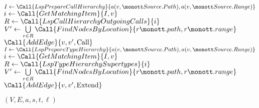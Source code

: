 \begin{algorithm}
\begin{algorithmic}[1]
		\Statex
		\State $I \gets \Call{LspPrepareCallHierarchy}{a(v, \tt{Source.Path}), a(v, \tt{Source.Range})}$
		\State $i \gets \Call{GetMatchingItem}{I, v}$
		\State $R \gets \Call{LspCallHierarchyOutgoingCalls}{i}$
		\State $V' \gets \bigcup\limits_{r \in R} \Call{FindNodesByLocation}{r\tt{.path}, r\tt{.range}}$
		\State $\Call{AddEdge}{v, v', \text{Call}}$
		\EndFor
		\State $I \gets \Call{LspPrepareTypeHierarchy}{a(v, \tt{Source.Path}), a(v, \tt{Source.Range})}$
		\State $i \gets \Call{GetMatchingItem}{I, v}$
		\State $R \gets \Call{LspTypeHierarchySupertypes}{i}$
		\State $V' \gets \bigcup\limits_{r \in R} \Call{FindNodesByLocation}{r\tt{.path}, r\tt{.range}}$
		\State $\Call{AddEdge}{v, v', \text{Extend}}$
		\EndFor
		\EndIf{}
		\EndFor

		\Statex
		\State {} 
		\State \Return $(V, E, a, s, t, \ell)$

		\Statex
	\end{algorithmic}
\end{algorithm}

